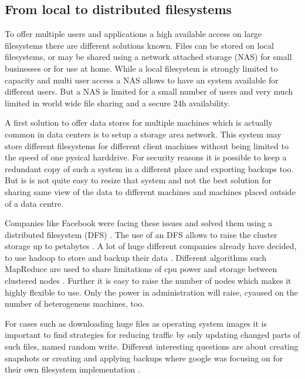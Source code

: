\subsection{From local to distributed filesystems}


To offer multiple users and applications a high available access on large filesystems there are different solutions known. 
Files can be stored on local filesystems, or may be shared using a network attached storage (NAS) for small businesses or for use at home. 
While a local filesystem is strongly limited to capacity and multi user access a NAS allows to have an system available for different users. 
But a NAS is limited for a small number of users and very much limited in world wide file sharing and a secure 24h availability.

A first solution to offer data stores for multiple machines which is actually common in data centers is to setup a storage area network. 
This system may store different filesystems for different client machines without being limited to the speed of one pysical harddrive. 
For security reasons it is possible to keep a redundant copy of such a system in a different place and exporting backups too. 
But is is not quite easy to resize that system and not the best solution for sharing same view of the data to different machines and machines placed outside of a data centre.

Companies like Facebook were facing these issues and solved them using a distributed filesystem (DFS) \cite{fb-hadoop}. 
The use of an DFS allows to raise the cluster storage  up to petabytes  \cite{fb-hadoop}. 
A lot of huge different companies already have decided, to use hadoop to store and backup their data  \cite{hadoop-poweredby}. 
Different algorithms such MapReduce are used to share limitations of cpu power and storage between clustered nodes \cite{dean2008mapreduce}. 
Further it is easy to raise the number of nodes which makes it highly flexible to use. Only the power in administration will raise, cyaused on the number of heterogeneus machines, too.

For cases such as downloading huge files as operating system images it is important to find strategies for reducing traffic by only updating changed parts of such files, named random write.
Different interesting questions are about creating snapshots or creating and applying backups where google was focusing on for their own filesystem implementation \cite{ghemawat2003google}.

